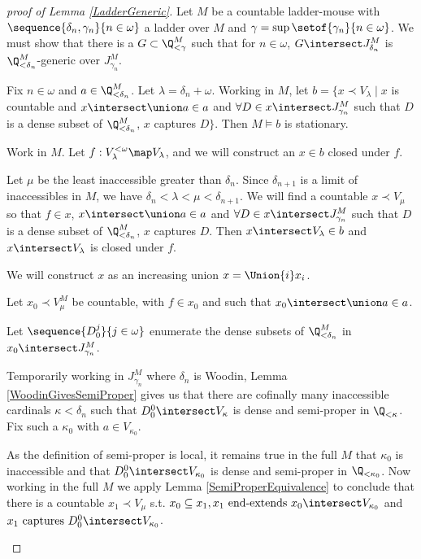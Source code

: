 \documentclass[oneside,12pt]{amsart}
\begin{document}
\begin{proof}[proof of Lemma  \ref{LadderGeneric}]
Let $M$ be a countable ladder-mouse
with $\sequence{\delta_n,\gamma_n}{n\in\omega}$ a ladder over $M$ and
$\gamma=\sup\setof{\gamma_n}{n\in\omega}$.
We must show that
there is a $G\subset \Q_{<\gamma}^M$ such that for $n\in\omega$,
$G\intersect J^M_{\delta_n}$ is $\Q_{<\delta_n}^M$-generic over $J^M_{\gamma_n}$.

\begin{claim}[Claim 1]
Fix $n\in\omega$ and $a\in \Q_{<\delta_n}^M$.
Let $\lambda = \delta_n + \omega$. Working in $M$,
let  $b=\{x \prec V_{\lambda} \mid x $ is countable and
$x\intersect\union a \in a$ and $\forall D\in x\intersect J^M_{\gamma_n}$ such that $D$ is a dense subset of $\Q_{<\delta_n}^M$, $x$ captures $D \}$.
Then $M\models b$ is stationary.
\end{claim}
\begin{subproof}
Work in $M$. Let $f:V_{\lambda}^{<\omega}\map V_{\lambda}$, and we will
construct an $x\in b$ closed under $f$.

Let $\mu$ be the least inaccessible greater than $\delta_n$. Since $\delta_{n+1}$ is a limit
of inaccessibles in $M$, we have $\delta_n < \lambda < \mu < \delta_{n+1}$. We will find a countable
$x \prec V_{\mu}$ so that $f\in x$,
$x\intersect\union a \in a$ and $\forall D\in x\intersect J^M_{\gamma_n}$ such that $D$ is a dense subset of $\Q_{<\delta_n}^M$, $x$ captures $D$.
Then $x\intersect V_{\lambda} \in b$ and $x\intersect V_{\lambda}$ is closed under $f$.

We will construct $x$ as an increasing union $x = \Union{i} x_i$. 

Let $x_0 \prec V^M_{\mu}$ be countable, with $f\in x_0$ and such that $x_0\intersect \union a \in a$.

Let $\sequence{D_0^j}{j\in\omega}$ enumerate the dense subsets of $\Q_{<\delta_n}^M$ in $x_0\intersect J^M_{\gamma_n}$.


Temporarily working in $J^M_{\gamma_n}$ where $\delta_n$
is Woodin, Lemma \ref{WoodinGivesSemiProper} gives us that there are cofinally many inaccessible cardinals
$\kappa<\delta_n$ such
that $D^0_0\intersect V_{\kappa}$ is dense and semi-proper in $\Q_{<\kappa}$.
Fix such a $\kappa_0$ with $a\in V_{\kappa_0}$.

As the definition of semi-proper is local, it remains true in the full $M$ that
$\kappa_0$ is inaccessible and that $D^0_0\intersect V_{\kappa_0}$ is dense and semi-proper in $\Q_{<\kappa_0}$.
Now working in the full $M$ we apply Lemma \ref{SemiProperEquivalence} to conclude that there is a countable 
$x_1 \prec V_{\mu}$
s.t.  $x_0\subseteq x_1, x_1 \text{ end-extends } x_0 \intersect V_{\kappa_0}$ and $ x_1 \text{ captures } D_0^0 \intersect V_{\kappa_0}$.


\end{subproof}
\end{proof}
\end{document}
